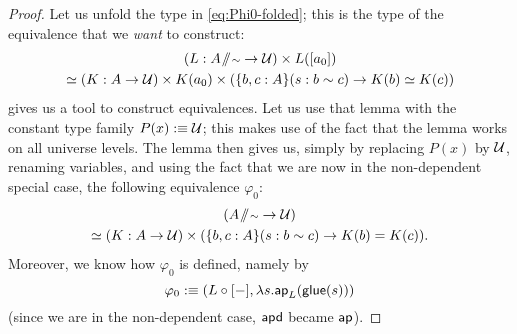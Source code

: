 \begin{proof}
Let us unfold the type in \eqref{eq:Phi0-folded}; this is the type of the equivalence
that we \emph{want} to construct:
\begin{align}
\begin{gathered}
 (L : A \! \sslash \! {\scriptstyle \sim} \to \mathcal{U}) \times L([a_0]) \\
\simeq (K : A \to \mathcal{U}) \times K(a_0) \times (\{b, c : A\}(s : b \sim c) \to K(b) \simeq K(c))
\end{gathered}
\end{align}
 gives us a tool to construct equivalences.
Let us use that lemma with the constant type family $P(x) :\equiv \mathcal{U}$;
this makes use of the fact that the lemma works on all universe levels.
The lemma then gives us, simply by replacing $P(x)$ by $\mathcal{U}$,
renaming variables, and using the fact that we are now in the non-dependent
special case, the following equivalence $\varphi_0$:
\begin{align}\label{eq:phi0}
\begin{gathered}
 (A \! \sslash \! {\scriptstyle \sim} \to \mathcal{U}) \\
\simeq  (K : A \to \mathcal{U}) \times (\{b, c : A\}(s : b \sim c) \to K(b) = K(c)) \text{.}
\end{gathered}
\end{align}
Moreover, we know how $\varphi_0$ is defined, namely by
\begin{equation}\label{eq:paths-phi0-compute}
\varphi_0 :\equiv (L \circ [-], \lambda s. \mathsf{ap}_L(\mathsf{glue}(s)))
\end{equation}
(since we are in the non-dependent case, $\mathsf{apd}$ became $\mathsf{ap}$).


\end{proof}

